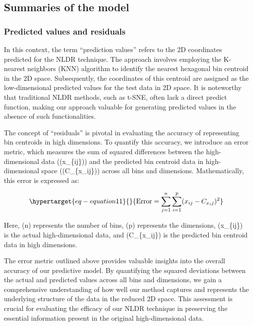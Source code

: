 \documentclass[
  12pt]{article}
\begin{document}
\hypertarget{sec-summary}{%
\subsection{Summaries of the model}\label{sec-summary}}

\hypertarget{predicted-values-and-residuals}{%
\subsubsection{Predicted values and
residuals}\label{predicted-values-and-residuals}}

In this context, the term ``prediction values'' refers to the 2D
coordinates predicted for the NLDR technique. The approach involves
employing the K-nearest neighbors (KNN) algorithm to identify the
nearest hexagonal bin centroid in the 2D space. Subsequently, the
coordinates of this centroid are assigned as the low-dimensional
predicted values for the test data in 2D space. It is noteworthy that
traditional NLDR methods, such as t-SNE, often lack a direct predict
function, making our approach valuable for generating predicted values
in the absence of such functionalities.

The concept of ``residuals'' is pivotal in evaluating the accuracy of
representing bin centroids in high dimensions. To quantify this
accuracy, we introduce an error metric, which measures the sum of
squared differences between the high-dimensional data ((x\_\{ij\})) and
the predicted bin centroid data in high-dimensional space
((C\_\{x\_ij\})) across all bins and dimensions. Mathematically, this
error is expressed as:

\begin{equation}\protect\hypertarget{eq-equation11}{}{
\text{Error} = \sum_{j = 1}^{n}\sum_{i = 1}^{p} (x_{ij} - C_{x_ij})^2
}\label{eq-equation11}\end{equation}

Here, (n) represents the number of bins, (p) represents the dimensions,
(x\_\{ij\}) is the actual high-dimensional data, and (C\_\{x\_ij\}) is
the predicted bin centroid data in high dimensions.

The error metric outlined above provides valuable insights into the
overall accuracy of our predictive model. By quantifying the squared
deviations between the actual and predicted values across all bins and
dimensions, we gain a comprehensive understanding of how well our method
captures and represents the underlying structure of the data in the
reduced 2D space. This assessment is crucial for evaluating the efficacy
of our NLDR technique in preserving the essential information present in
the original high-dimensional data.
\end{document}
